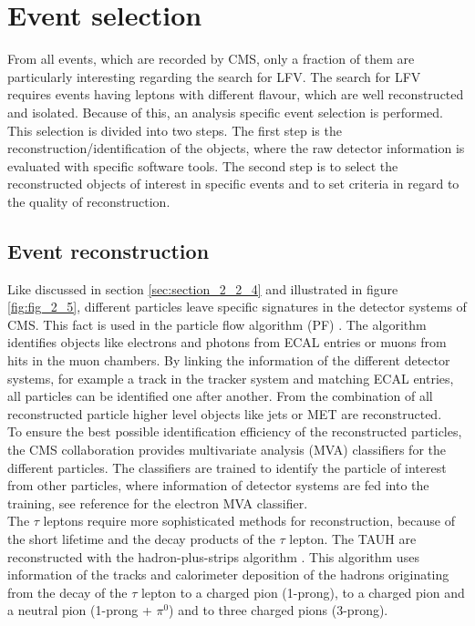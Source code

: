 \section{Event selection}
\label{sec:section_3_2}

From all events, which are recorded by \gls{CMS}, only a fraction of them are particularly interesting regarding the search for \gls{LFV}. The search for \gls{LFV} requires events having leptons with different flavour, which are well reconstructed and isolated. Because of this, an analysis specific event selection is performed. This selection is divided into two steps. The first step is the reconstruction/identification of the objects, where the raw detector information is evaluated with specific software tools. The second step is to select the reconstructed objects of interest in specific events and to set criteria in regard to the quality of reconstruction. 


\subsection{Event reconstruction}
\label{sec:section_3_2_1}

Like discussed in section \ref{sec:section_2_2_4} and illustrated in figure \ref{fig:fig_2_5}, different particles leave specific signatures in the detector systems of \gls{CMS}. This fact is used in the particle flow algorithm (\gls{PF}) \cite{PF}. The algorithm identifies objects like electrons and photons from \gls{ECAL} entries or muons from hits in the muon chambers. By linking the information of the different detector systems, for example a track in the tracker system and matching \gls{ECAL} entries, all particles can be identified one after another.  From the combination of all reconstructed particle higher level objects like jets or \gls{MET} are reconstructed. \\

To ensure the best possible identification efficiency of the reconstructed particles, the \gls{CMS} collaboration provides multivariate analysis (\gls{MVA}) classifiers for the different particles. The classifiers are trained to identify the particle of interest from other particles, where information of detector systems are fed into the training, see reference \cite{ERECO} for the electron \gls{MVA} classifier. \\

The $\tau$ leptons require more sophisticated methods for reconstruction, because of the short lifetime and the decay products of the $\tau$ lepton. The \gls{TAUH} are reconstructed with the hadron-plus-strips algorithm \cite{TAURECO}. This algorithm uses information of the tracks and calorimeter deposition of the hadrons originating from the decay of the $\tau$ lepton to a charged pion (1-prong), to a charged pion and a neutral pion (1-prong + $\pi^0$) and to three charged pions (3-prong). \\

